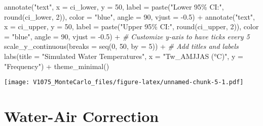 \documentclass[
]{article}
\newenvironment{Shaded}{\begin{snugshade}}{\end{snugshade}}
\newcommand{\AttributeTok}[1]{\textcolor[rgb]{0.77,0.63,0.00}{#1}}
\newcommand{\CommentTok}[1]{\textcolor[rgb]{0.56,0.35,0.01}{\textit{#1}}}
\newcommand{\DecValTok}[1]{\textcolor[rgb]{0.00,0.00,0.81}{#1}}
\newcommand{\FloatTok}[1]{\textcolor[rgb]{0.00,0.00,0.81}{#1}}
\newcommand{\FunctionTok}[1]{\textcolor[rgb]{0.00,0.00,0.00}{#1}}
\newcommand{\NormalTok}[1]{#1}
\newcommand{\SpecialCharTok}[1]{\textcolor[rgb]{0.00,0.00,0.00}{#1}}
\newcommand{\StringTok}[1]{\textcolor[rgb]{0.31,0.60,0.02}{#1}}
\begin{document}
\begin{Shaded}
\begin{Highlighting}[]
  \FunctionTok{annotate}\NormalTok{(}\StringTok{"text"}\NormalTok{, }\AttributeTok{x =}\NormalTok{ ci\_lower, }\AttributeTok{y =} \DecValTok{50}\NormalTok{, }\AttributeTok{label =} \FunctionTok{paste}\NormalTok{(}\StringTok{"Lower 95\% CI:"}\NormalTok{, }\FunctionTok{round}\NormalTok{(ci\_lower, }\DecValTok{2}\NormalTok{)), }
           \AttributeTok{color =} \StringTok{"blue"}\NormalTok{, }\AttributeTok{angle =} \DecValTok{90}\NormalTok{, }\AttributeTok{vjust =} \SpecialCharTok{{-}}\FloatTok{0.5}\NormalTok{) }\SpecialCharTok{+}
  \FunctionTok{annotate}\NormalTok{(}\StringTok{"text"}\NormalTok{, }\AttributeTok{x =}\NormalTok{ ci\_upper, }\AttributeTok{y =} \DecValTok{50}\NormalTok{, }\AttributeTok{label =} \FunctionTok{paste}\NormalTok{(}\StringTok{"Upper 95\% CI:"}\NormalTok{, }\FunctionTok{round}\NormalTok{(ci\_upper, }\DecValTok{2}\NormalTok{)), }
           \AttributeTok{color =} \StringTok{"blue"}\NormalTok{, }\AttributeTok{angle =} \DecValTok{90}\NormalTok{, }\AttributeTok{vjust =} \SpecialCharTok{{-}}\FloatTok{0.5}\NormalTok{) }\SpecialCharTok{+}
   \CommentTok{\# Customize y{-}axis to have ticks every 5}
  \FunctionTok{scale\_y\_continuous}\NormalTok{(}\AttributeTok{breaks =} \FunctionTok{seq}\NormalTok{(}\DecValTok{0}\NormalTok{, }\DecValTok{50}\NormalTok{, }\AttributeTok{by =} \DecValTok{5}\NormalTok{)) }\SpecialCharTok{+}
  \CommentTok{\# Add titles and labels}
  \FunctionTok{labs}\NormalTok{(}\AttributeTok{title =} \StringTok{"Simulated Water Temperatures"}\NormalTok{,}
       \AttributeTok{x =} \StringTok{"Tw\_AMJJAS (°C)"}\NormalTok{,}
       \AttributeTok{y =} \StringTok{"Frequency"}\NormalTok{) }\SpecialCharTok{+}
  \FunctionTok{theme\_minimal}\NormalTok{()}
\end{Highlighting}
\end{Shaded}

\texttt{[image: V1075\_MonteCarlo\_files/figure-latex/unnamed-chunk-5-1.pdf]}

\hypertarget{water-air-correction}{%
\section{Water-Air Correction}\label{water-air-correction}}
\end{document}
